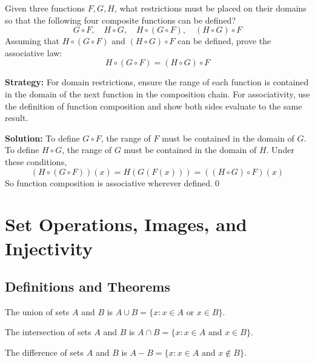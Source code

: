 \begin{problembox}
\begin{problemstatement}
Given three functions \( F, G, H \), what restrictions must be placed on their domains so that the following four composite functions can be defined?
\[
G \circ F, \quad H \circ G, \quad H \circ (G \circ F), \quad (H \circ G) \circ F
\]
Assuming that \( H \circ (G \circ F) \) and \( (H \circ G) \circ F \) can be defined, prove the associative law:
\[
H \circ (G \circ F) = (H \circ G) \circ F
\]
\end{problemstatement}
\end{problembox}

\noindent\textbf{Strategy:} For domain restrictions, ensure the range of each function is contained in the domain of the next function in the composition chain. For associativity, use the definition of function composition and show both sides evaluate to the same result.

\bigskip\noindent\textbf{Solution:}  
To define \( G \circ F \), the range of \( F \) must be contained in the domain of \( G \).  
To define \( H \circ G \), the range of \( G \) must be contained in the domain of \( H \).  
Under these conditions,  
\[
(H \circ (G \circ F))(x) = H(G(F(x))) = ((H \circ G) \circ F)(x)
\]  
So function composition is associative wherever defined.\qed

\section{Set Operations, Images, and Injectivity}

\subsection*{Definitions and Theorems}

\begin{definition}[Union]
The union of sets $A$ and $B$ is $A \cup B = \{x : x \in A \text{ or } x \in B\}$.
\end{definition}

\begin{definition}[Intersection]
The intersection of sets $A$ and $B$ is $A \cap B = \{x : x \in A \text{ and } x \in B\}$.
\end{definition}

\begin{definition}
The difference of sets $A$ and $B$ is $A - B = \{x : x \in A \text{ and } x \notin B\}$.
\end{definition}

